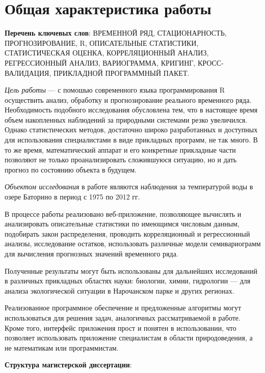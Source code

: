 
\newpage

\chapter*{Общая характеристика работы}

\textbf{Перечень ключевых слов}: ВРЕМЕННОЙ РЯД, СТАЦИОНАРНОСТЬ, ПРОГНОЗИРОВАНИЕ, R, ОПИСАТЕЛЬНЫЕ СТАТИСТИКИ, СТАТИСТИЧЕСКАЯ ОЦЕНКА, КОРРЕЛЯЦИОННЫЙ АНАЛИЗ, РЕГРЕССИОННЫЙ АНАЛИЗ, ВАРИОГРАММА, КРИГИНГ, КРОСС-ВАЛИДАЦИЯ, ПРИКЛАДНОЙ ПРОГРАММНЫЙ ПАКЕТ\@.

\textit{Цель работы} --- с помошью современного языка программирования R осуществить анализ, обработку и прогнозирование реального временного ряда. Необходимость подобного исследования обусловлена тем, что в настоящее время объем накопленных наблюдений за природными системами резко увеличился. Однако статистических методов, достаточно широко разработанных и доступных для использования специалистами в виде прикладных программ, не так много. В то же время, математический аппарат и его конкретные прикладные части позволяют не только проанализировать сложившуюся ситуацию, но и дать прогноз по состоянию объекта в будущем.

\textit{Объектом исследования} в работе являются наблюдения за температурой воды в озере Баторино в период с 1975 по 2012 гг.

В процессе работы реализовано веб-приложение, позволяющее вычислять и анализировать описательные статистики по имеющимся числовым данным, подобирать закон распределения, проводить корреляционный и регрессионный анализы, исследование остатков, использовать различные модели семивариограмм для вычисления прогнозных значений временного ряда.

Полученные результаты могут быть использованы для дальнейших исследований в различных прикладных областях науки: биологии, химии, гидрологии --- для анализа экологической ситуации в Нарочанском парке и других регионах.

Реализованное программное обеспечение и предложенные алгоритмы могут использоваться для решения задач, аналогичных рассматриваемой в работе. Кроме того, интерфейс приложения прост и понятен в использовании, что позволяет использовать приложение специалистам в области природоведения, а не математикам или программистам.

\textbf{Структура магистерской диссертации}:

